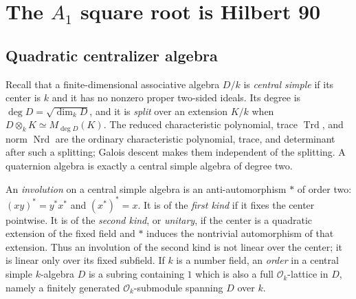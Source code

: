 \documentclass[11pt,reqno]{amsart}
\theoremstyle{definition}
\theoremstyle{remark}
\newcommand{\cO}{\mathcal O}
\newcommand{\Trd}{\operatorname{Trd}}
\newcommand{\Nrd}{\operatorname{Nrd}}
\begin{document}
\section{The \texorpdfstring{$A_1$}{A1} square root is Hilbert 90}

\subsection{Quadratic centralizer algebra}

Recall that a finite-dimensional associative algebra \(D/k\) is
\emph{central simple} if its center is \(k\) and it has no nonzero proper
two-sided ideals.  Its degree is
\(\deg D=\sqrt{\dim_kD}\), and it is \emph{split} over an extension \(K/k\)
when \(D\otimes_kK\simeq M_{\deg D}(K)\).  The reduced characteristic
polynomial, trace \(\Trd\), and norm \(\Nrd\) are the ordinary characteristic
polynomial, trace, and determinant after such a splitting; Galois descent
makes them independent of the splitting.  A quaternion algebra is exactly a
central simple algebra of degree two.

An \emph{involution} on a central simple algebra is an anti-automorphism
\(*\) of order two: \((xy)^*=y^*x^*\) and \((x^*)^*=x\).
It is of the \emph{first kind} if it fixes the center pointwise.  It is of the
\emph{second kind}, or \emph{unitary}, if the center is a quadratic
extension of the fixed field and \(*\) induces the nontrivial automorphism of
that extension.  Thus an involution of the second kind is not linear over the
center; it is linear only over its fixed subfield.
If \(k\) is a number field, an \emph{order} in a central simple \(k\)-algebra
\(D\) is a subring containing \(1\) which is also a full
\(\cO_k\)-lattice in
\(D\), namely a finitely generated \(\cO_k\)-submodule spanning \(D\) over
\(k\).
\end{document}
